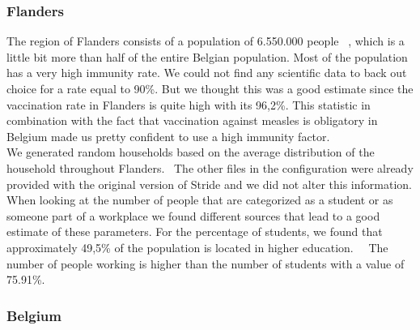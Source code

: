 \documentclass[runningheads]{llncs}
\begin{document}
	\subsubsection{Flanders} 
	The region of Flanders consists of a population of 6.550.000 people ~\cite{1}, which is a little bit more than half of the entire Belgian population. Most of the population has a very high immunity rate. We could not find any scientific data to back out choice for a rate equal to 90\%. But we thought this was a good estimate since the vaccination rate in Flanders is quite high with its 96,2\%. This statistic in combination with the fact that vaccination against measles is obligatory in Belgium made us pretty confident to use a high immunity factor. ~\cite{2} ~\cite{3} ~\cite{4}\\
	\noindent
	We generated random households based on the average distribution of the household throughout Flanders.~\cite{5} The other files in the configuration were already provided with the original version of Stride and we did not alter this information. When looking at the number of people that are categorized as a student or as someone part of a workplace we found different sources that lead to a good estimate of these parameters. For the percentage of students, we found that approximately 49,5\% of the population is located in higher education.~\cite{6}~\cite{17} The number of people working is higher than the number of students with a value of 75.91\%.~\cite{7}
	\newpage
	\subsubsection{Belgium}
	
\end{document}
